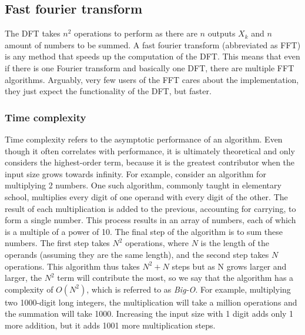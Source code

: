 \subsection{Fast fourier transform}
The DFT takes $n^2$ operations to perform as there are $n$ outputs $X_k$ and $n$ amount of numbers to be summed. A fast fourier transform (abbreviated as FFT) is any method that speeds up the computation of the DFT. This means that even if there is one Fourier transform and basically one DFT, there are multiple FFT algorithms. Arguably, very few users of the FFT cares about the implementation, they just expect the functionality of the DFT, but faster. 

\subsubsection{Time complexity}
Time complexity refers to the asymptotic performance of an algorithm. Even though it often correlates with performance, it is ultimately theoretical and only considers the highest-order term, because it is the greatest contributor when the input size grows towards infinity. For example, consider an algorithm for multiplying 2 numbers. One such algorithm, commonly taught in elementary school, multiplies every digit of one operand with every digit of the other. The result of each multiplication is added to the previous, accounting for carrying, to form a single number. This process results in an array of numbers, each of which is a multiple of a power of 10. The final step of the algorithm is to sum these numbers. The first step takes $N^2$ operations, where $N$ is the length of the operands (assuming they are the same length), and the second step takes $N$ operations. This algorithm thus takes $N^2+N$ steps but as N grows larger and larger, the $N^2$ term will contribute the most, so we say that the algorithm has a complexity of $O(N^2)$, which is referred to as \textit{Big-O}. For example, multiplying two 1000-digit long integers, the multiplication will take a million operations and the summation will take 1000. Increasing the input size with 1 digit adds only 1 more addition, but it adds 1001 more multiplication steps.

